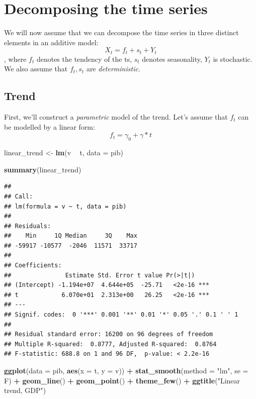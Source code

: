 \documentclass[
]{article}
\newenvironment{Shaded}{\begin{snugshade}}{\end{snugshade}}
\newcommand{\DataTypeTok}[1]{\textcolor[rgb]{0.13,0.29,0.53}{#1}}
\newcommand{\KeywordTok}[1]{\textcolor[rgb]{0.13,0.29,0.53}{\textbf{#1}}}
\newcommand{\NormalTok}[1]{#1}
\newcommand{\OperatorTok}[1]{\textcolor[rgb]{0.81,0.36,0.00}{\textbf{#1}}}
\newcommand{\StringTok}[1]{\textcolor[rgb]{0.31,0.60,0.02}{#1}}
\begin{document}
\section{Decomposing the time series}

We will now assume that we can decompose the time series in three
distinct elements in an additive model: \[ X_t = f_t+ s_t + Y_t \],
where \(f_t\) denotes the tendency of the ts, \(s_t\) denotes
seasonality, \(Y_t\) is stochastic. We also assume that \(f_t, s_t\) are
\emph{deterministic}.

\subsection{Trend}

First, we'll construct a \emph{parametric} model of the trend. Let's
assume that \(f_t\) can be modelled by a linear form:
\[ f_t = \gamma_0 + \gamma *t \]

\begin{Shaded}
\begin{Highlighting}[]
\NormalTok{linear_trend <-}\StringTok{ }\KeywordTok{lm}\NormalTok{(v }\OperatorTok{~}\StringTok{ }\NormalTok{t, }\DataTypeTok{data =}\NormalTok{ pib)}

\KeywordTok{summary}\NormalTok{(linear_trend)}
\end{Highlighting}
\end{Shaded}

\begin{verbatim}
## 
## Call:
## lm(formula = v ~ t, data = pib)
## 
## Residuals:
##    Min     1Q Median     3Q    Max 
## -59917 -10577  -2046  11571  33717 
## 
## Coefficients:
##               Estimate Std. Error t value Pr(>|t|)    
## (Intercept) -1.194e+07  4.644e+05  -25.71   <2e-16 ***
## t            6.070e+01  2.313e+00   26.25   <2e-16 ***
## ---
## Signif. codes:  0 '***' 0.001 '**' 0.01 '*' 0.05 '.' 0.1 ' ' 1
## 
## Residual standard error: 16200 on 96 degrees of freedom
## Multiple R-squared:  0.8777, Adjusted R-squared:  0.8764 
## F-statistic: 688.8 on 1 and 96 DF,  p-value: < 2.2e-16
\end{verbatim}

\begin{Shaded}
\begin{Highlighting}[]
\KeywordTok{ggplot}\NormalTok{(}\DataTypeTok{data =}\NormalTok{ pib, }\KeywordTok{aes}\NormalTok{(}\DataTypeTok{x =}\NormalTok{ t, }\DataTypeTok{y =}\NormalTok{ v)) }\OperatorTok{+}\StringTok{ }\KeywordTok{stat_smooth}\NormalTok{(}\DataTypeTok{method =} \StringTok{"lm"}\NormalTok{, }
    \DataTypeTok{se =}\NormalTok{ F) }\OperatorTok{+}\StringTok{ }\KeywordTok{geom_line}\NormalTok{() }\OperatorTok{+}\StringTok{ }\KeywordTok{geom_point}\NormalTok{() }\OperatorTok{+}\StringTok{ }\KeywordTok{theme_few}\NormalTok{() }\OperatorTok{+}\StringTok{ }\KeywordTok{ggtitle}\NormalTok{(}\StringTok{"Linear trend, GDP"}\NormalTok{)}
\end{Highlighting}
\end{Shaded}
\end{document}
